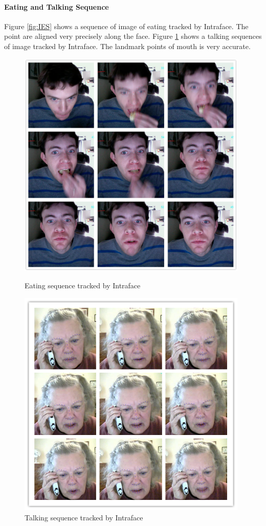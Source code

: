 \paragraph{Eating and Talking Sequence}
Figure \ref{fig:IES} shows a sequence of image of eating tracked by Intraface. The point are aligned very precisely along the face. Figure \ref{fig:ITS} shows a talking sequences of image tracked by Intraface. The landmark points of mouth is very accurate.
\newpage
\begin{figure}[p]
\centering
\includegraphics[width=110mm]{imgs/Tracking_Intraface_eating_red.png}
\caption{Eating sequence tracked by Intraface}
\label{fig:IES}
\includegraphics[width=110mm]{imgs/Talking_Intraface_140711_176_184.png}
\caption{Talking sequence tracked by Intraface}
\label{fig:ITS}
\end{figure}
\newpage
